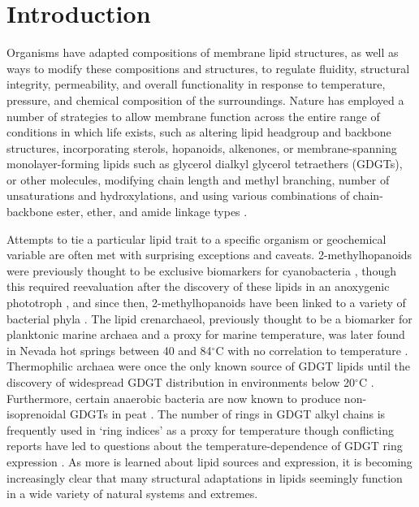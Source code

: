 \section{Introduction}
Organisms have adapted compositions of membrane lipid structures, as well as ways to modify these compositions and structures, to regulate fluidity, structural integrity, permeability, and overall functionality in response to temperature, pressure, and chemical composition of the surroundings. Nature has employed a number of strategies to allow membrane function across the entire range of conditions in which life exists, such as altering lipid headgroup and backbone structures, incorporating sterols, hopanoids, alkenones, or membrane-spanning monolayer-forming lipids such as glycerol dialkyl glycerol tetraethers (GDGTs), or other molecules, modifying chain length and methyl branching, number of unsaturations and hydroxylations, and using various combinations of chain-backbone ester, ether, and amide linkage types \citep{marlowe1984long, belin2018hopanoid, van2008membrane}.

Attempts to tie a particular lipid trait to a specific organism or geochemical variable are often met with surprising exceptions and caveats. 2-methylhopanoids were previously thought to be exclusive biomarkers for cyanobacteria \citep{summons1992methylhopanoids}, though this required reevaluation after the discovery of these lipids in an anoxygenic phototroph \citep{rashby2007biosynthesis}, and since then, 2-methylhopanoids have been linked to a variety of bacterial phyla \citep{ricci2014diverse}. The lipid crenarchaeol, previously thought to be a biomarker for planktonic marine archaea and a proxy for marine temperature, was later found in Nevada hot springs between 40 and 84$^{\circ}$C with no correlation to temperature \citep{pearson2004nonmarine}. Thermophilic archaea were once the only known source of GDGT lipids until the discovery of widespread GDGT distribution in environments below 20$^{\circ}$C \citep{schouten2000widespread}. Furthermore, certain anaerobic bacteria are now known to produce non-isoprenoidal GDGTs in peat \citep{weijers2006membrane}. The number of rings in GDGT alkyl chains is frequently used in `ring indices' as a proxy for temperature \citep{schouten2002distributional, tierney2012gdgt} though conflicting reports have led to questions about the temperature-dependence of GDGT ring expression \citep{sollich2017heat}. As more is learned about lipid sources and expression, it is becoming increasingly clear that many structural adaptations in lipids seemingly function in a wide variety of natural systems and extremes.

